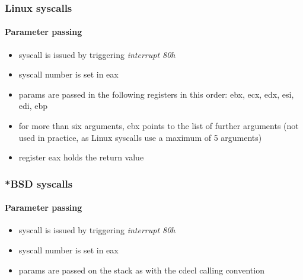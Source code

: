 \clearpage

\subsubsection{Linux syscalls}

\paragraph{Parameter passing}

\begin{itemize}
\item syscall is issued by triggering {\em interrupt 80h}
\item syscall number is set in eax
\item params are passed in the following registers in this order: ebx, ecx, edx, esi, edi, ebp
\item for more than six arguments, ebx points to the list of further arguments (not used in practice, as Linux syscalls use a maximum of 5 arguments)
\item register eax holds the return value
\end{itemize}

\subsubsection{*BSD syscalls}

\paragraph{Parameter passing}

\begin{itemize}
\item syscall is issued by triggering {\em interrupt 80h}
\item syscall number is set in eax
\item params are passed on the stack as with the cdecl calling convention
\end{itemize}

